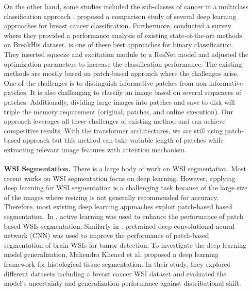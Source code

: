 \documentclass[review]{cvpr}
\begin{document}
On the other hand, some studies included the sub-classes of cancer in a multiclass classification approach \cite{Han2017}. \cite{9218931} proposed a comparison study of several deep learning approaches for breast cancer classification. Furthermore, \cite{BENHAMMOU20209} conducted a survey where they provided a performance analysis of existing state-of-the-art methods on BreakHis dataset. \cite{10.1371/journal.pone.0214587} is one of these best approaches for binary classification. They inserted squeeze and excitation module to a ResNet model and adjusted the optimization parameters to increase the classification performance. The existing methods are mostly based on patch-based approach where the challenges arise. One of the challenges is to distinguish informative patches from non-informative patches. It is also challenging to classify an image based on several sequences of patches. Additionally, dividing large images into patches and save to disk will triple the memory requirement (original, patches, and online execution). Our approach leverages all these challenges of existing method and can achieve competitive results. With the transformer architectures, we are still using patch-based approach but this method can take variable length of patches while extracting relevant image features with attention mechanism.\\
\\
\textbf{WSI Segmentation.} There is a large body of work on WSI segmentation\cite{vu2018methods}. Most recent works on WSI segmentation focus on deep learning\cite{10.3389/fmed.2019.00264}. However, applying deep learning for WSI segmentation is a challenging task because of the large size of the images where resizing is not generally recommended for accuracy. Therefore, most existing deep learning approaches exploit patch-based based segmentation\cite{PRIEGOTORRES2020113387, Fu_2018}. In \cite{10.1117/12.2581229}, active learning was used to enhance the performance of patch based WSIs segmentation. Similarly in \cite{Xulargescale2017}, pretrained deep convolutional neural network (CNN) was used to improve the performance of patch-based segmentation of brain WSIs for tumor detection. To investigate the deep learning model generalization, Mahendra Khened et al.\cite{khened2020generalized} proposed a deep learning framework for histological tissue segmentation. In their study, they explored different datasets including a breast cancer WSI dataset and evaluated the model's uncertainty and generalization performance against distributional shift. 
\end{document}
